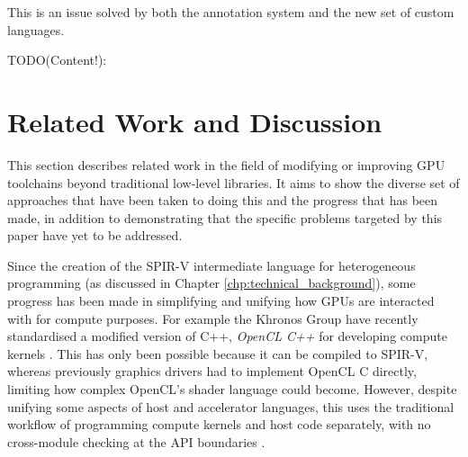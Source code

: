 \documentclass[a4paper,12pt,twoside,openright]{report}
\begin{document}
This is an issue solved by both the annotation system and the new set of custom
languages.

TODO(Content!):





\chapter{Related Work and Discussion}



\label{chp:related_work}

This section describes related work in the field of modifying or improving GPU
toolchains beyond traditional low-level libraries. It aims to show the diverse
set of approaches that have been taken to doing this and the progress that has
been made, in addition to demonstrating that the specific problems targeted by
this paper have yet to be addressed.

Since the creation of the SPIR-V intermediate language for heterogeneous
programming (as discussed in Chapter \ref{chp:technical_background}), some
progress has been made in simplifying and unifying how GPUs are interacted with
for compute purposes. For example the Khronos Group have recently standardised
a modified version of C++, \textit{OpenCL C++} for developing compute kernels
\cite{OpenCL22Release} \cite{OpenCLCPPWhitePaper} \cite{OpenCL}. This has only
been possible because it can be compiled to SPIR-V, whereas previously graphics
drivers had to implement OpenCL C directly, limiting how complex OpenCL's
shader language could become. However, despite unifying some aspects of host
and accelerator languages, this uses the traditional workflow of programming
compute kernels and host code separately, with no cross-module checking at the
API boundaries \cite{OpenCL22Release}.
\end{document}
